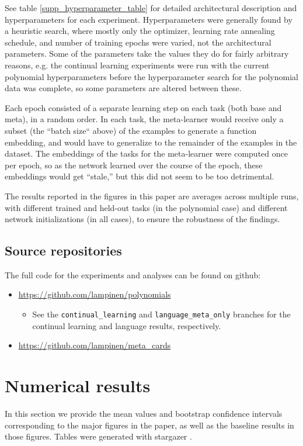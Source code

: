 See table \ref{supp_hyperparameter_table} for detailed architectural description and hyperparameters for each experiment. Hyperparameters were generally found by a heuristic search, where mostly only the optimizer, learning rate annealing schedule, and number of training epochs were varied, not the architectural parameters. Some of the parameters take the values they do for fairly arbitrary reasons, e.g. the continual learning experiments were run with the current polynomial hyperparameters before the hyperparameter search for the polynomial data was complete, so some parameters are altered between these. \par
Each epoch consisted of a separate learning step on each task (both base and meta), in a random order. In each task, the meta-learner would receive only a subset (the ``batch size`` above) of the examples to generate a function embedding, and would have to generalize to the remainder of the examples in the dataset. The embeddings of the tasks for the meta-learner were computed once per epoch, so as the network learned over the course of the epoch, these embeddings would get ``stale,'' but this did not seem to be too detrimental. \par 
The results reported in the figures in this paper are averages across multiple runs, with different trained and held-out tasks (in the polynomial case) and different network initializations (in all cases), to ensure the robustness of the findings. \par 

\subsection{Source repositories}
The full code for the experiments and analyses can be found on github:
\begin{itemize}
\item \url{https://github.com/lampinen/polynomials}
    \begin{itemize}
        \item See the \verb|continual_learning| and \verb|language_meta_only| branches for the continual learning and language results, respectively. 
    \end{itemize}
\item \url{https://github.com/lampinen/meta_cards} 
\end{itemize}
\section{Numerical results} \label{app_numerical_results}
In this section we provide the mean values and bootstrap confidence intervals corresponding to the major figures in the paper, as well as the baseline results in those figures. Tables were generated with stargazer \citep{Hlavac2018}. \par

